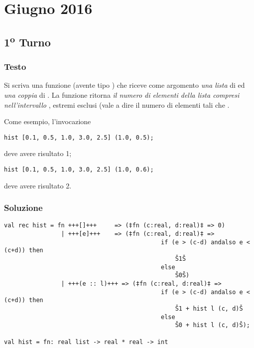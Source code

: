 \section{Giugno 2016}

\subsection{1\textsuperscript{o} Turno}

\subsubsection{Testo}

Si scriva una funzione  (avente tipo ) che riceve come argomento \emph{una lista} di  ed \emph{una coppia} di .
La funzione  ritorna \emph{il numero di elementi della lista compresi nell'intervallo }, estremi esclusi (vale a dire il numero di elementi  tali che .

\medskip
Come esempio, l'invocazione

\begin{lstlisting}
hist [0.1, 0.5, 1.0, 3.0, 2.5] (1.0, 0.5);
\end{lstlisting}

deve avere risultato 1;

\begin{lstlisting}
hist [0.1, 0.5, 1.0, 3.0, 2.5] (1.0, 0.6);
\end{lstlisting}

deve avere risultato 2.

\subsubsection{Soluzione}

\begin{lstlisting}[style = SML, caption = {Definizione della funzione \sml{hist}}]
val rec hist = fn +++[]+++	   => (‡fn (c:real, d:real)‡ => 0)
				| +++[e]+++	   => (‡fn (c:real, d:real)‡ =>
											if (e > (c-d) andalso e < (c+d)) then
												Š1Š
											else
												Š0Š)
				| +++(e :: l)+++ => (‡fn (c:real, d:real)‡ =>
											if (e > (c-d) andalso e < (c+d)) then
												Š1 + hist l (c, d)Š
											else
												Š0 + hist l (c, d)Š);

val hist = fn: real list -> real * real -> int
\end{lstlisting}

